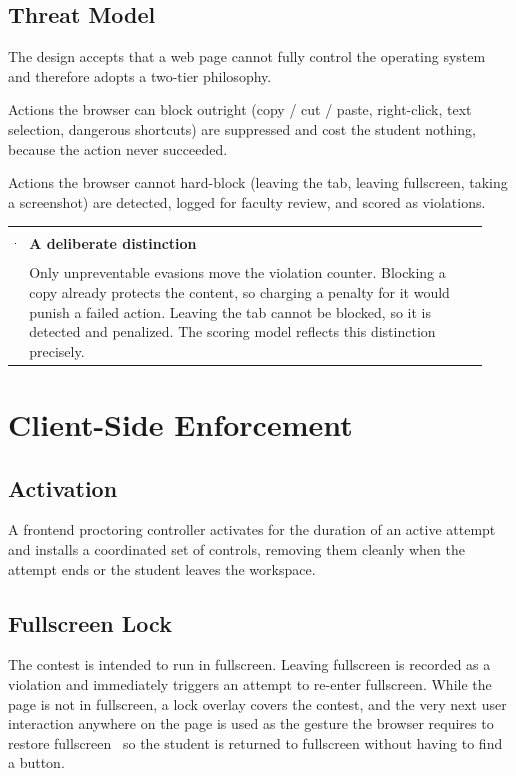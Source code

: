 \documentclass[12pt,a4paper,oneside]{report}
\makeatletter
\newenvironment{callout}[1]{\par\vspace{4pt}\noindent
  \begin{tabular}{@{}p{0.014\linewidth}@{\hspace{0.6em}}p{0.93\linewidth}@{}}
  \textcolor{boxframe}{\rule{2pt}{\baselineskip}} & \textbf{\textcolor{tcetblue}{#1}}\\[2pt] & }{\end{tabular}\par\vspace{6pt}}
\makeatother
\begin{document}
\section{Threat Model}
The design accepts that a web page cannot fully control the operating system and
therefore adopts a two-tier philosophy.
\begin{description}[leftmargin=1.6em,style=nextline]
  \item[Prevent what the browser can prevent] Actions the browser can block
        outright (copy / cut / paste, right-click, text selection, dangerous
        shortcuts) are suppressed and cost the student nothing, because the
        action never succeeded.
  \item[Detect and penalize what it cannot] Actions the browser cannot hard-block
        (leaving the tab, leaving fullscreen, taking a screenshot) are detected,
        logged for faculty review, and scored as violations.
\end{description}

\begin{callout}{A deliberate distinction}
Only unpreventable evasions move the violation counter. Blocking a copy already
protects the content, so charging a penalty for it would punish a failed action.
Leaving the tab cannot be blocked, so it is detected and penalized. The scoring
model reflects this distinction precisely.
\end{callout}

\chapter{Client-Side Enforcement}
\section{Activation}
A frontend proctoring controller activates for the duration of an active attempt
and installs a coordinated set of controls, removing them cleanly when the
attempt ends or the student leaves the workspace.

\section{Fullscreen Lock}
The contest is intended to run in fullscreen. Leaving fullscreen is recorded as a
violation and immediately triggers an attempt to re-enter fullscreen. While the
page is not in fullscreen, a lock overlay covers the contest, and the very next
user interaction anywhere on the page is used as the gesture the browser requires
to restore fullscreen \textemdash\ so the student is returned to fullscreen
without having to find a button.
\end{document}
